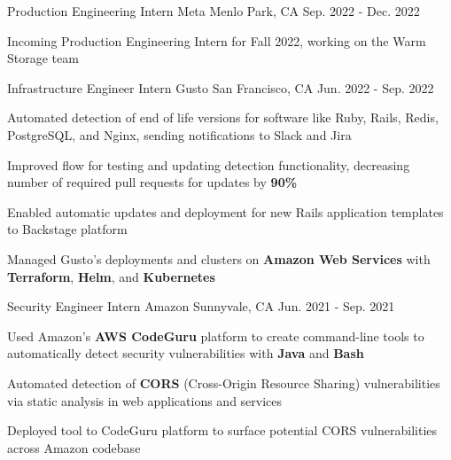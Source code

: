 

\begin{cventries}

\cventry
{Production Engineering Intern} %
{Meta} %
{Menlo Park, CA} %
{Sep. 2022 - Dec. 2022} %
{
  \begin{cvitems} %
    \item {Incoming Production Engineering Intern for Fall 2022, working on the Warm Storage team}
  \end{cvitems}
}

\cventry
{Infrastructure Engineer Intern} %
{Gusto} %
{San Francisco, CA} %
{Jun. 2022 - Sep. 2022} %
{
  \begin{cvitems} %
    \item {Automated detection of end of life versions for software like Ruby, Rails, Redis, PostgreSQL, and Nginx, sending notifications to Slack and Jira}
    \item {Improved flow for testing and updating detection functionality, decreasing number of required pull requests for updates by \textbf{90\%}}
    \item {Enabled automatic updates and deployment for new Rails application templates to Backstage platform}
    \item {Managed Gusto's deployments and clusters on \textbf{Amazon Web Services} with \textbf{Terraform}, \textbf{Helm}, and \textbf{Kubernetes}}
  \end{cvitems}
}

\cventry
  {Security Engineer Intern} %
  {Amazon} %
  {Sunnyvale, CA} %
  {Jun. 2021 - Sep. 2021} %
  {
    \begin{cvitems} %
      \item {Used Amazon's \textbf{AWS CodeGuru} platform to create command-line tools to automatically detect security vulnerabilities with \textbf{Java} and \textbf{Bash}}
      \item {Automated detection of \textbf{CORS} (Cross-Origin Resource Sharing) vulnerabilities via static analysis in web applications and services}
      \item {Deployed tool to CodeGuru platform to surface potential CORS vulnerabilities across Amazon codebase}
    \end{cvitems}
  }


\end{cventries}
